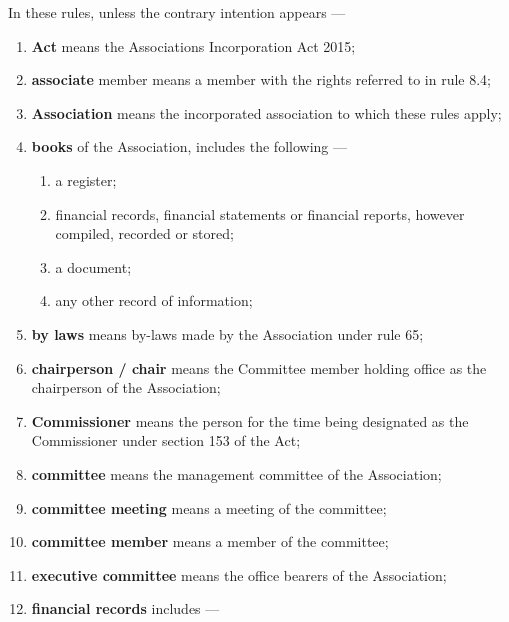 In these rules, unless the contrary intention appears ---

\begin{enumerate}

\item \textbf{Act} means the Associations Incorporation Act 2015;
\item \textbf{associate} member means a member with the rights referred to in rule 8.4;
\item \textbf{Association} means the incorporated association to which these rules apply;
\item \textbf{books} of the Association, includes the following ---

  \begin{enumerate}
  \def\labelenumi{\arabic{enumi}.}
  
  \item a register;
  \item financial records, financial statements or financial reports, however compiled, recorded or stored;
  \item a document;
  \item any other record of information;
  \end{enumerate}
\item \textbf{by laws} means by-laws made by the Association under rule 65;
\item \textbf{chairperson / chair} means the Committee member holding office as the chairperson of the Association;
\item \textbf{Commissioner} means the person for the time being designated as the Commissioner under section 153 of the Act;
\item \textbf{committee} means the management committee of the Association;
\item \textbf{committee meeting} means a meeting of the committee;
\item \textbf{committee member} means a member of the committee;
\item \textbf{executive committee} means the office bearers of the Association;
\item \textbf{financial records} includes ---

  \begin{enumerate}
  \def\labelenumi{\arabic{enumi}.}
  

\end{enumerate}
\end{enumerate}

